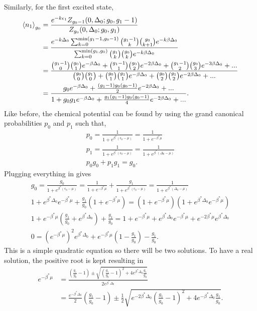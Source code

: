 Similarly, for the first excited state,
\begin{align}
    \left<{n_1}\right>_{g_0}&=\frac{e^{-k\epsilon_1} Z_{g_0-1}(0,\Delta_0;g_0,g_1-1)}{Z_{g_0}(0,\Delta_0;g_0,g_1)}\nonumber\\
    &=\frac{e^{-k\Delta_0}\sum_{k=0}^{\text{min}(g_1-1,g_0-1)} {g_1-1\choose k}{g_0 \choose k+1} e^{-k\beta\Delta_0}}{\sum_{k=0}^{\text{min}(g_1,g_0)} {g_1\choose k}{g_0 \choose k} e^{-k\beta\Delta_0}}\nonumber\\
    &=\frac{{g_1-1\choose 0}{g_0\choose 1} e^{-\beta\Delta_0} +{g_1-1\choose 1}{g_0\choose 2} e^{-2\beta\Delta_0}+{g_1-1\choose 2}{g_0\choose 3}e^{-3\beta\Delta_0}+...}{{g_0\choose 0}{g_1\choose 0}+{g_0\choose 1}{g_1\choose 1}e^{-\beta\Delta_0}+{g_0\choose 2}{g_1\choose 2}e^{-2\beta\Delta_0}+...}\nonumber\\
    &=\frac{g_0e^{-\beta\Delta_0}+\frac{(g_1-1)g_0(g_0-1)}{2}e^{-2\beta\Delta_0}+...}{1+g_0g_1 e^{-\beta\Delta_0}+\frac{g_1(g_1-1)g_0(g_0-1)}{4}e^{-2\beta\Delta_0}+...}.
\end{align} 
Like before, the chemical potential can be found by using the grand canonical probabilities $p_0$ and $p_1$ such that,
\begin{gather}
    p_0=\frac{1}{1+e^{\beta^*(\epsilon_0-\mu)}}=\frac{1}{1+e^{-\beta^* \mu}} \label{grcn}\\
    p_1=\frac{1}{1+e^{\beta^*(\epsilon_0-\mu)}}=\frac{1}{1+e^{\beta^*(\Delta_0-\mu)}}\\
    p_0g_0+p_1g_1=g_0.
\end{gather}
Plugging everything in gives
\begin{gather}
    g_0=\frac{g_0}{1+e^{\beta^*(\epsilon_0-\mu)}}=\frac{1}{1+e^{-\beta^*\mu}}+\frac{g_1}{1+e^{\beta^*(\epsilon_0-\mu)}}=\frac{1}{1+e^{\beta^*(\Delta_0-\mu)}}\nonumber\\
    1+e^{\beta^*\Delta_0} e^{-\beta^*\mu}+\frac{g_1}{g_0}(1+e^{-\beta^*\mu})=(1+e^{-\beta^*\mu})(1+e^{\beta^*\Delta_0} e^{-\beta^* \mu})\nonumber\\
    1+e^{-\beta^*\mu}(\frac{g_1}{g_0}+e^{\beta^*\Delta_0})+\frac{g_1}{g_0}=1+e^{-\beta^*\mu}+e^{\beta^*\Delta_0}e^{-\beta^*\mu}+e^{-2\beta^*\mu}e^{\beta^*\Delta_0}\nonumber\\
    0=(e^{-\beta^*\mu})^2 e^{\beta^*\Delta_0} +e ^{-\beta^*\mu}(1-\frac{g_1}{g_0})-\frac{g_1}{g_0}.
\end{gather}
This is a simple quadratic equation so there will be two solutions. To have a real solution, the positive root is kept resulting in
\begin{align}
    e^{-\beta^*\mu}&=\frac{(\frac{g_1}{g_0}-1)\pm\sqrt{(\frac{g_1}{g_0}-1)^2+4e^{\beta^*\Delta_0}\frac{g_1}{g_0}}}{2e^{\beta^*\Delta_0}}\nonumber\\
    &=\frac{e^{-\beta^*\Delta_0}}{2}(\frac{g_1}{g_0}-1)\pm \frac{1}{2}\sqrt{e^{-2\beta^*\Delta_0} (\frac{g_1}{g_0}-1)^2+ 4e^{-\beta^*\Delta_0}\frac{g_1}{g_0}}.
\end{align}
